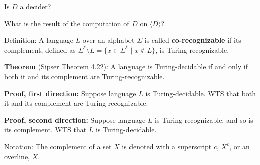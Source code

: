 \documentclass[12pt, oneside]{article}
\begin{document}
Is  $D$ a  decider? 

\vspace{50pt}

What is the result of the computation  of $D$  on  $\langle D \rangle$?

\vfill


\newpage
Definition: A language $L$ over an  alphabet $\Sigma$ is called {\bf co-recognizable} if its complement,  defined
as $\Sigma^* \setminus L  = \{ x  \in  \Sigma^* \mid x \notin  L \}$, is Turing-recognizable.


\vfill 
{\bf  Theorem} (Sipser Theorem 4.22): A  language is Turing-decidable if and only if both  it and its complement
are Turing-recognizable.

{\bf Proof, first direction:}  Suppose  language  $L$ is  Turing-decidable.   WTS  that both it and its complement 
are Turing-recognizable.

\vfill

{\bf Proof, second direction:}  Suppose  language  $L$ is  Turing-recognizable, and  so is  its complement.   WTS  that $L$
is Turing-decidable.
\vfill


Notation: The complement  of a set $X$ is denoted with  a superscript $c$, $X^c$, or an overline,  $\overline{X}$. \vfill
\end{document}
